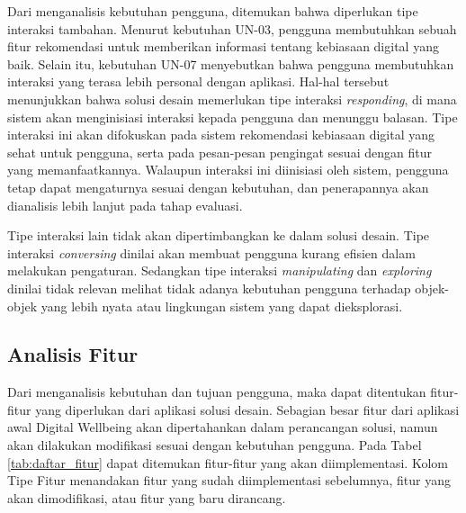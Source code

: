 Dari menganalisis kebutuhan pengguna, ditemukan bahwa diperlukan tipe interaksi tambahan. Menurut kebutuhan UN-03, pengguna membutuhkan sebuah fitur rekomendasi untuk memberikan informasi tentang kebiasaan digital yang baik. Selain itu, kebutuhan UN-07 menyebutkan bahwa pengguna membutuhkan interaksi yang terasa lebih personal dengan aplikasi. Hal-hal tersebut menunjukkan bahwa solusi desain memerlukan tipe interaksi \textit{responding}, di mana sistem akan menginisiasi interaksi kepada pengguna dan menunggu balasan. Tipe interaksi ini akan difokuskan pada sistem rekomendasi kebiasaan digital yang sehat untuk pengguna, serta pada pesan-pesan pengingat sesuai dengan fitur yang memanfaatkannya. Walaupun interaksi ini diinisiasi oleh sistem, pengguna tetap dapat mengaturnya sesuai dengan kebutuhan, dan penerapannya akan dianalisis lebih lanjut pada tahap evaluasi.

Tipe interaksi lain tidak akan dipertimbangkan ke dalam solusi desain. Tipe interaksi \textit{conversing} dinilai akan membuat pengguna kurang efisien dalam melakukan pengaturan. Sedangkan tipe interaksi \textit{manipulating} dan \textit{exploring} dinilai tidak relevan melihat tidak adanya kebutuhan pengguna terhadap objek-objek yang lebih nyata atau lingkungan sistem yang dapat dieksplorasi.


\subsection{Analisis Fitur}
\label{subsec:analisis_fitur}

Dari menganalisis kebutuhan dan tujuan pengguna, maka dapat ditentukan fitur-fitur yang diperlukan dari aplikasi solusi desain. Sebagian besar fitur dari aplikasi awal Digital Wellbeing akan dipertahankan dalam perancangan solusi, namun akan dilakukan modifikasi sesuai dengan kebutuhan pengguna. Pada Tabel \ref{tab:daftar_fitur} dapat ditemukan fitur-fitur yang akan diimplementasi. Kolom Tipe Fitur menandakan fitur yang sudah diimplementasi sebelumnya, fitur yang akan dimodifikasi, atau fitur yang baru dirancang. 

